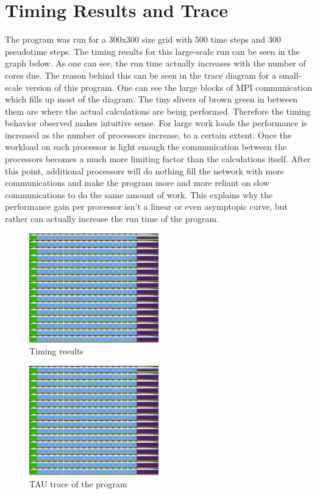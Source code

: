 \documentclass[12pt]{article}
\begin{document}
\section{Timing Results and Trace}
The program was run for a 300x300 size grid with 500 time steps and 300 pseudotime steps. The timing results for this 
large-scale run can be seen in the graph below. As one can see, the run time actually increases with the number of 
cores due. The reason behind this can be seen in the trace diagram for a small-scale version of this program. One can 
see the large blocks of MPI communication which fills up most of the diagram. The tiny slivers of brown green in 
between them are where the actual calculations are being performed. Therefore the timing behavior observed makes 
intuitive sense. For large work loads the performance is increased as the number of processors increase, to a certain 
extent. Once the workload on each processor is light enough the communication between the processors becomes a much 
more limiting factor than the calculations itself. After this point, additional processors will do nothing fill the 
network with more communications and make the program more and more reliant on slow communications to do the same 
amount of work. This explains why the performance gain per processor isn't a linear or even asymptopic curve, but 
rather can actually increase the run time of the program.
\begin{figure}[h]
\centering
\caption{ Timing results}
\includegraphics[width=0.5\textwidth]{trace.png}
\end{figure}
\begin{figure}[h]
\centering
\caption{TAU trace of the program}
\includegraphics[width=0.5\textwidth]{trace.png}
\end{figure}
\end{document}
